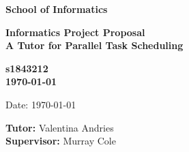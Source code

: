 \documentclass[a4paper,11pt]{article}
\newcommand{\examnumber}{s1843212}
\newcommand{\field}{A Tutor for Parallel Task Scheduling}
\newcommand{\tutor}{Valentina Andries}
\newcommand{\supervisor}{Murray Cole}
\begin{document}
\begin{minipage}[b]{110mm}
        {\Huge\bf School of Informatics
        \vspace*{17mm}}
\end{minipage}
\hfill
\begin{minipage}[t]{40mm}               
\end{minipage}
\par\noindent
\vspace*{2cm}
\begin{center}
        \Large\bf Informatics Project Proposal \\
        \Large\bf \field
\end{center}
\vspace*{1.5cm}
\begin{center}
        \bf \examnumber\\
        \monthyeardate\today
\end{center}
\vspace*{5mm}

%
%                       
\begin{abstract}
\end{abstract}

\vspace*{1cm}

\vspace*{3cm}
Date: \today

\vfill
{\bf Tutor:} \tutor\\
{\bf Supervisor:} \supervisor
\newpage

\setcounter{page}{1}                            %
\footruleheight{1pt}
\headruleheight{1pt}
\rhead{- \thepage}
\cfoot{}
%
\tableofcontents                                %
\end{document}
